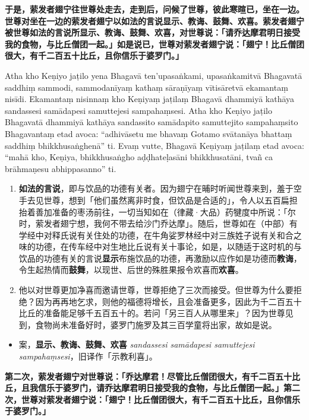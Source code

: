 \textbf{于是，萦发者翅宁往世尊处走去，走到后，问候了世尊，彼此寒暄已，坐在一边。世尊对坐在一边的萦发者翅宁以如法的言说显示、教诲、鼓舞、欢喜。萦发者翅宁被世尊如法的言说所显示、教诲、鼓舞、欢喜，对世尊说：「请乔达摩君明日接受我的食物，与比丘僧团一起。」如是说已，世尊对萦发者翅宁说：「翅宁！比丘僧团很大，有千二百五十比丘，且你信乐于婆罗门。」}

Atha kho Keṇiyo jaṭilo yena Bhagavā ten’upasaṅkami, upasaṅkamitvā Bhagavatā saddhiṃ sammodi, sammodanīyaṃ kathaṃ sāraṇīyaṃ vītisāretvā ekamantaṃ nisīdi. Ekamantaṃ nisinnaṃ kho Keṇiyaṃ jaṭilaṃ Bhagavā dhammiyā kathāya sandassesi samādapesi samuttejesi sampahaṃsesi. Atha kho Keṇiyo jaṭilo Bhagavatā dhammiyā kathāya sandassito samādapito samuttejito sampahaṃsito Bhagavantaṃ etad avoca: “adhivāsetu me bhavaṃ Gotamo svātanāya bhattaṃ saddhiṃ bhikkhusaṅghenā” ti. Evaṃ vutte, Bhagavā Keṇiyaṃ jaṭilaṃ etad avoca: “mahā kho, Keṇiya, bhikkhusaṅgho aḍḍhateḷasāni bhikkhusatāni, tvañ ca brāhmaṇesu abhippasanno” ti.

\begin{enumerate}\item \textbf{如法的言说}，即与饮品的功德有关者。因为翅宁在晡时听闻世尊来到，羞于空手去见世尊，想到「他们虽然离非时食，但饮品是合适的」，令人以五百扁担抬着善加准备的枣汤前往，一切当知如在（律藏·大品）药犍度中所说：「尔时，萦发者翅宁想，我何不带去给沙门乔达摩」。随后，世尊如在（中部）有学经中对释氏说有关住处的功德，在牛角娑罗林经中对三族姓子说有关和合之味的功德，在传车经中对生地比丘说有关十事论，如是，以随适于这时机的与饮品的功德有关的言说\textbf{显示}布施饮品的功德，再激励以应作如是功德而\textbf{教诲}，令生起热情而\textbf{鼓舞}，以现世、后世的殊胜果报令欢喜而\textbf{欢喜}。
\item 他以对世尊更加净喜而邀请世尊，世尊拒绝了三次而接受。但世尊为什么要拒绝？因为再再地乞求，则他的福德将增长，且会准备更多，因此为千二百五十比丘的准备能足够千五百五十的。若问「另三百人从哪里来」？因为世尊见到，食物尚未准备好时，婆罗门施罗及其三百学童将出家，故如是说。\end{enumerate}

\begin{itemize}\item 案，\textbf{显示、教诲、鼓舞、欢喜} \textit{sandassesi samādapesi samuttejesi sampahaṃsesi}，旧译作「示教利喜」。\end{itemize}

\textbf{第二次，萦发者翅宁对世尊说：「乔达摩君！尽管比丘僧团很大，有千二百五十比丘，且我信乐于婆罗门，请乔达摩君明日接受我的食物，与比丘僧团一起。」第二次，世尊对萦发者翅宁说：「翅宁！比丘僧团很大，有千二百五十比丘，且你信乐于婆罗门。」}

